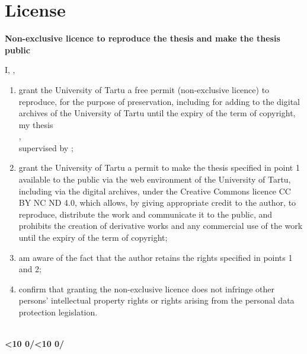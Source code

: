 \section*{License} \label{sec:license} 

\makeatletter
\newcommand{\licenseAuthor}{\@author}
\newcommand{\licenseTitle}{\@title}
\newcommand{\licenseSupervisor}{%
  \begingroup
  \def\degree##1{, ##1}%
  \@supervisor
  \endgroup
}
\makeatother
\newcommand{\licenseTwoDigits}[1]{\ifnum#1<10 0\fi\number#1}
\newcommand{\licenseDate}{\licenseTwoDigits{\day}/\licenseTwoDigits{\month}/\number\year}

\begingroup
\linespread{1.0}\selectfont
\setlength{\parindent}{0pt}
\setlength{\parskip}{0pt}

\vspace{12pt}

\textbf{Non-exclusive licence to reproduce the thesis and make the thesis public}

\vspace{12pt}

I, \licenseAuthor,

\vspace{12pt}

\begin{enumerate}
  \setlength{\itemsep}{12pt}
  \setlength{\parsep}{0pt}
  \setlength{\topsep}{0pt}

  \item grant the University of Tartu a free permit (non-exclusive licence) to reproduce, for the purpose of preservation, including for adding to the digital archives of the University of Tartu until the expiry of the term of copyright, my thesis\\

  \licenseTitle,\\ %

  supervised by \licenseSupervisor;

  \item grant the University of Tartu a permit to make the thesis specified in point 1 available to the public via the web environment of the University of Tartu, including via the digital archives, under the Creative Commons licence CC BY NC ND 4.0, which allows, by giving appropriate credit to the author, to reproduce, distribute the work and communicate it to the public, and prohibits the creation of derivative works and any commercial use of the work until the expiry of the term of copyright;

  \item am aware of the fact that the author retains the rights specified in points 1 and 2;

  \item confirm that granting the non-exclusive licence does not infringe other persons' intellectual property rights or rights arising from the personal data protection legislation.
\end{enumerate}

\vspace{12pt}

\licenseAuthor\\
\textbf{\licenseDate}

\endgroup
